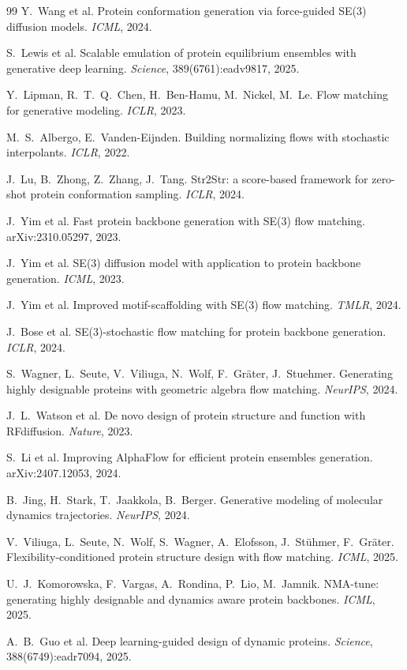 \documentclass[12pt]{article}
\begin{document}
\begin{thebibliography}{99}
 Y.~Wang et al. Protein conformation generation via force-guided SE(3) diffusion models. \emph{ICML}, 2024.

 S.~Lewis et al. Scalable emulation of protein equilibrium ensembles with generative deep learning. \emph{Science}, 389(6761):eadv9817, 2025.

 Y.~Lipman, R.~T.~Q.~Chen, H.~Ben-Hamu, M.~Nickel, M.~Le. Flow matching for generative modeling. \emph{ICLR}, 2023.

 M.~S.~Albergo, E.~Vanden-Eijnden. Building normalizing flows with stochastic interpolants. \emph{ICLR}, 2022.

 J.~Lu, B.~Zhong, Z.~Zhang, J.~Tang. Str2Str: a score-based framework for zero-shot protein conformation sampling. \emph{ICLR}, 2024.

 J.~Yim et al. Fast protein backbone generation with SE(3) flow matching. arXiv:2310.05297, 2023.

 J.~Yim et al. SE(3) diffusion model with application to protein backbone generation. \emph{ICML}, 2023.

 J.~Yim et al. Improved motif-scaffolding with SE(3) flow matching. \emph{TMLR}, 2024.

 J.~Bose et al. SE(3)-stochastic flow matching for protein backbone generation. \emph{ICLR}, 2024.

 S.~Wagner, L.~Seute, V.~Viliuga, N.~Wolf, F.~Gr\"ater, J.~Stuehmer. Generating highly designable proteins with geometric algebra flow matching. \emph{NeurIPS}, 2024.

 J.~L.~Watson et al. De novo design of protein structure and function with RFdiffusion. \emph{Nature}, 2023.

 S.~Li et al. Improving AlphaFlow for efficient protein ensembles generation. arXiv:2407.12053, 2024.

 B.~Jing, H.~Stark, T.~Jaakkola, B.~Berger. Generative modeling of molecular dynamics trajectories. \emph{NeurIPS}, 2024.

 V.~Viliuga, L.~Seute, N.~Wolf, S.~Wagner, A.~Elofsson, J.~St\"uhmer, F.~Gr\"ater. Flexibility-conditioned protein structure design with flow matching. \emph{ICML}, 2025.

 U.~J.~Komorowska, F.~Vargas, A.~Rondina, P.~Lio, M.~Jamnik. NMA-tune: generating highly designable and dynamics aware protein backbones. \emph{ICML}, 2025.

 A.~B.~Guo et al. Deep learning-guided design of dynamic proteins. \emph{Science}, 388(6749):eadr7094, 2025.

\end{thebibliography}
\end{document}
